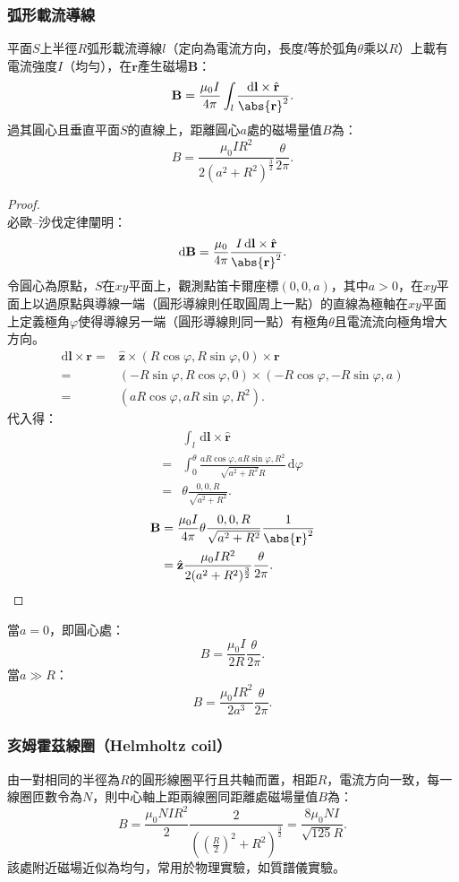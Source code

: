 \documentclass[a4paper,12pt]{report}
\begin{document}
\begin{itemize}
\subsubsection{弧形載流導線}
平面$S$上半徑$R$弧形載流導線$l$（定向為電流方向，長度$l$等於弧角$\theta$乘以$R$）上載有電流強度$I$（均勻），在$\mathbf{r}$產生磁場$\mathbf{B}$：
\[\mathbf{B}=\frac{\mu_0I}{4\pi}\int_{l}\frac{\mathrm{d}\mathbf{l}\times\hat{\mathbf{r}}}{\abs{\mathbf{r}}^2}.\]
過其圓心且垂直平面$S$的直線上，距離圓心$a$處的磁場量值$B$為：
\[B=\frac{\mu_0IR^2}{2(a^2+R^2)^{\frac{3}{2}}}\frac{\theta}{2\pi}.\]
\begin{proof}\mbox{}\\
必歐–沙伐定律闡明：
\[\mathrm{d}\mathbf{B}=\frac{\mu_0}{4\pi}\frac{I\,\mathrm{d}\mathbf{l}\times\hat{\mathbf{r}}}{\abs{\mathbf{r}}^2}.\]
令圓心為原點，$S$在$xy$平面上，觀測點笛卡爾座標$(0,0,a)$，其中$a>0$，在$xy$平面上以過原點與導線一端（圓形導線則任取圓周上一點）的直線為極軸在$xy$平面上定義極角$\varphi$使得導線另一端（圓形導線則同一點）有極角$\theta$且電流流向極角增大方向。
\[\begin{aligned}
\mathrm{d}\mathbf{l}\times\mathbf{r}=&\hat{\mathbf{z}}\times(R\cos\varphi,R\sin\varphi,0)\times\mathbf{r}\\
=&(-R\sin\varphi,R\cos\varphi,0)\times(-R\cos\varphi,-R\sin\varphi,a)\\
=&(aR\cos\varphi,aR\sin\varphi,R^2).
\end{aligned}\]
代入得：
\[\begin{aligned}
&\int_{l}\,\mathrm{d}\mathbf{l}\times\hat{\mathbf{r}}\\
=&\int_0^{\theta}\frac{aR\cos\varphi,aR\sin\varphi,R^2}{\sqrt{a^2+R^2}R}\,\mathrm{d}\varphi\\
=&\theta\frac{0,0,R}{\sqrt{a^2+R^2}}.
\end{aligned}\]
\[\begin{aligned}
\mathbf{B} &= \frac{\mu_0I}{4\pi}\theta\frac{0,0,R}{\sqrt{a^2+R^2}}\frac{1}{\abs{\mathbf{r}}^2}\\
&=\hat{\mathbf{z}}\frac{\mu_0IR^2}{2(a^2+R^2)^{\frac{3}{2}}}\frac{\theta}{2\pi}.
\end{aligned}\]
\end{proof}
當$a=0$，即圓心處：
\[B=\frac{\mu_0I}{2R}\frac{\theta}{2\pi}.\]
當$a\gg R$：
\[B=\frac{\mu_0IR^2}{2a^3}\frac{\theta}{2\pi}.\]
\subsubsection{亥姆霍茲線圈（Helmholtz coil）}
由一對相同的半徑為$R$的圓形線圈平行且共軸而置，相距$R$，電流方向一致，每一線圈匝數令為$N$，則中心軸上距兩線圈同距離處磁場量值$B$為：
\[B=\frac{\mu_0NIR^2}{2}\frac{2}{\left(\left(\frac{R}{2}\right)^2+R^2\right)^{\frac{3}{2}}}=\frac{8\mu_0NI}{\sqrt{125}R}.\]
該處附近磁場近似為均勻，常用於物理實驗，如質譜儀實驗。

\end{itemize}
\end{document}
